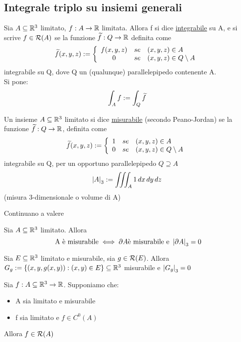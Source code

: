 \subsection{Integrale triplo su insiemi generali}
\begin{definition}
  Sia $A\subseteq \mathbb{R}^3$ limitato, $f: A \to \mathbb{R}$ limitata. Allora f si dice \underline{integrabile}
  su A, e si scrive $f\in\mathcal{R}(A)$ se la funzione $\widetilde{f}:Q\to\mathbb{R}$ definita come
  $$ \widetilde{f}(x,y,z) := \left\{\begin{array}{ccl}
    f(x,y,z) & se & (x,y,z)\in A \\
    0 & se & (x,y,z)\in Q\setminus A \\
  \end{array}\right.$$
  \ace integrabile su Q, dove Q \ace un (qualunque) parallelepipedo contenente A.\\
  Si pone: $$\int_A f := \int_{Q} \widetilde{f}$$ 
\end{definition}
\begin{definition}
  Un insieme $A \subseteq \mathbb{R}^3$ limitato si dice \underline{misurabile} (secondo Peano-Jordan) se la funzione
  $\widetilde{f} : Q \to \mathbb{R}$, definita come 
  $$ \widetilde{f}(x,y,z) := \left\{\begin{array}{ccl}
    1 & se & (x,y,z)\in A \\
    0 & se & (x,y,z)\in Q\setminus A \\
  \end{array}\right.$$
  \ace integrabile su Q, per un opportuno parallelepipedo $Q \supseteq A$
  $$\left\lvert A \right\rvert_3 := \iiint_{A} 1 \,dx\,dy\,dz$$
  (misura 3-dimensionale o volume di A)
\end{definition}
Continuano a valere 
\begin{theorem}
  Sia $A \subseteq \mathbb{R}^3$ limitato. Allora 
  $$\text{ A \`e misurabile} \iff \partial A \text{\`e misurabile e } \left\lvert \partial A \right\rvert_3 = 0$$
\end{theorem}
\begin{theorem}[BDPG, 14.11]
  Sia $E\subseteq \mathbb{R}^3$ limitato e misurabile, sia $g \in \mathcal{R}(E)$. Allora 
  $G_{g} := \{(x,y,g(x,y)) : (x,y)\in E\} \subseteq \mathbb{R}^3$ \ace misurabile e $\left\lvert G_{g} \right\rvert_3 = 0$
\end{theorem}
\begin{theorem}
  Sia $f : A \subseteq \mathbb{R}^3 \to \mathbb{R}$. Supponiamo che:
  \begin{itemize}
    \item A sia limitato e misurabile
    \item f sia limitato e $f \in C^0 (A)$
  \end{itemize}
  Allora $f\in \mathcal{R}(A)$
\end{theorem}
